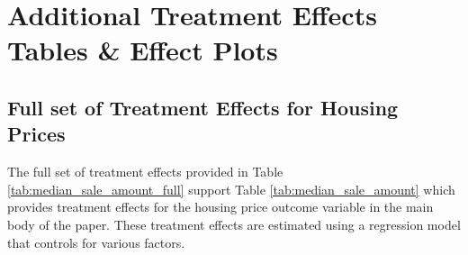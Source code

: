 \section{Additional Treatment Effects Tables \& Effect Plots} \label{sec:appxa}

\subsection{Full set of Treatment Effects for Housing Prices}

The full set of treatment effects provided in Table \ref{tab:median_sale_amount_full} support Table \ref{tab:median_sale_amount} which provides treatment effects for the housing price outcome variable in the main body of the paper. These treatment effects are estimated using a regression model that controls for various factors.

